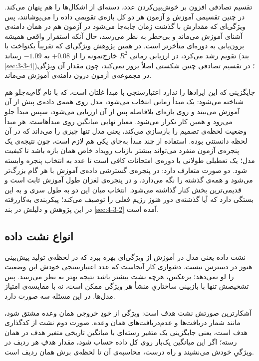 تقسیم تصادفی افزون بر خوش‌بین‌کردن عدد، دسته‌ای از اشکال‌ها را هم پنهان می‌کند. در چنین تقسیمی آموزش و
آزمون هر دو کل بازه‌ی تقویمی داده را می‌پوشانند، پس ویژگی‌ای که مقدارش با گذشت زمان
جابه‌جا می‌شود در آزمون هم در همان دامنه‌ی آشنای آموزش می‌ماند و بی‌خطر به نظر می‌رسد،
حال آنکه استقرار واقعی همیشه برون‌یابی به دوره‌ای متأخرتر است. در همین پژوهش ویژگی‌ای
که تقریباً یکنواخت با تقویم رشد می‌کرد، در ارزیابی زمانی $R^2$ خارج‌نمونه را از $+0.08$
به $-1.09$ رساند (بند \ref{sec:3-3-4})؛ در تقسیم تصادفی چنین شکستی اصلاً بروز نمی‌کند،
چون مقدار آن ویژگی در مجموعه‌ی آزمون درون دامنه‌ی آموزش می‌ماند.

جایگزینی که این ایرادها را ندارد اعتبارسنجی با مبدأ غلتان است، که با نام گام‌به‌جلو هم شناخته
می‌شود: یک مبدأ زمانی انتخاب می‌شود، مدل روی همه‌ی داده‌ی پیش از آن آموزش می‌بیند و روی
بازه‌ای بلافاصله پس از آن ارزیابی می‌شود، سپس مبدأ جلو می‌رود و همین کار تکرار می‌شود.
معیار نهایی میانگین روی مبدأهاست. هر مبدأ وضعیت لحظه‌ی تصمیم را بازسازی می‌کند، یعنی
مدل تنها چیزی را می‌داند که در آن لحظه دانستنی بوده. استفاده از چند مبدأ به‌جای یکی هم
لازم است، چون نتیجه‌ی یک پنجره‌ی آزمون منفرد می‌تواند بیشتر بازتاب رویداد خاص همان بازه
باشد تا کیفیت مدل؛ یک تعطیلی طولانی یا دوره‌ی امتحانات کافی است تا عدد به انتخاب پنجره
وابسته شود. دو صورت
متعارف دارد: در پنجره‌ی گسترشی داده‌ی آموزش با هر گام
بزرگ‌تر می‌شود و همه‌ی گذشته را نگه می‌دارد، و در پنجره‌ی لغزان طول آموزش ثابت است و قدیمی‌ترین بخش کنار گذاشته می‌شود. انتخاب میان این دو به
طول سری و به این بستگی دارد که آیا گذشته‌ی دور هنوز رژیم فعلی را توصیف می‌کند؛
پیکربندی به‌کاررفته در این پژوهش و دلیلش در بند \ref{sec:4-3-2} آمده است.

\subsection{انواع نشت داده}
\label{sec:2-4-2}

نشت داده یعنی مدل در آموزش از ویژگی‌ای بهره ببرد که در لحظه‌ی
تولید پیش‌بینی هنوز در دسترس نیست. دشواری کار آنجاست که عدد اعتبارسنجی خودش این وضعیت
را لو نمی‌دهد؛ برعکس، هرچه نشت بیشتر باشد نتیجه بهتر به نظر می‌رسد. پس تشخیصش تنها با
بازبینی ساختاریِ منشأ هر ویژگی ممکن است، نه با مقایسه‌ی امتیاز مدل‌ها. در این مسئله سه
صورت دارد.

آشکارترین صورتش نشت هدف است: ویژگی از خودِ خروجی همان وعده مشتق شود، مانند شمار
دریافت‌ها و عدم‌دریافت‌های همان وعده. صورت دوم نشت از کدگذاری هدف است، یعنی جایگزینی یک متغیر رسته‌ای با میانگین تاریخی متغیر هدف در همان رسته؛
اگر این میانگین یک‌بار روی کل داده حساب شود، مقدار هدفِ هر ردیف در ویژگیِ خودش می‌نشیند
و راه درست، محاسبه‌ی آن تا لحظه‌ی برش همان ردیف است.

